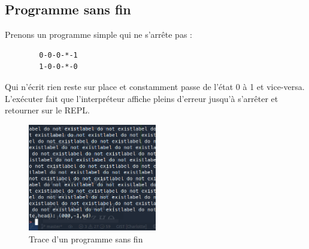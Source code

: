 \documentclass[11pt,colorlinks=true,a4paper]{article}
\begin{document}
    \subsection{Programme sans fin}
    Prenons un programme simple qui ne s'arrête pas :
    \begin{lstlisting}
        0-0-0-*-1
        1-0-0-*-0
    \end{lstlisting}
    Qui n'écrit rien reste sur place et constamment passe de l'état 0 à 1 et vice-versa.
    L'exécuter fait que l'interpréteur affiche pleins d'erreur jusqu'à s'arrêter et retourner sur le REPL.
    \begin{figure}[H]
        \center 
        \includegraphics[width=0.5\textwidth]{img/error.png}
        \caption{Trace d'un programme sans fin}
    \end{figure}
\end{document}
